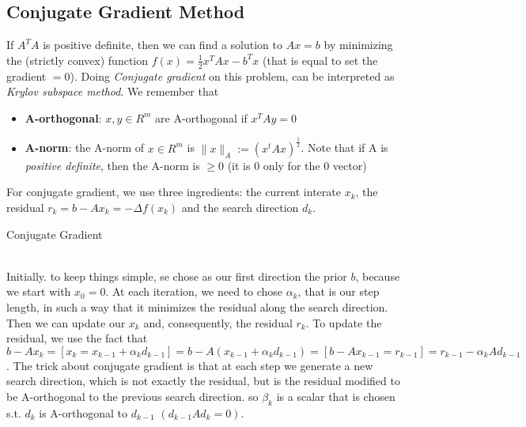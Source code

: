 \documentclass{article}
\begin{document}
\subsection{Conjugate Gradient Method}
If $A^{T}A$ is positive definite, then we can find a solution to $Ax = b$ by minimizing the (strictly convex) function $f(x) = \frac{1}{2}x^{T}Ax - b^{T}x$ (that is equal to set the gradient $= 0$). Doing \textit{Conjugate gradient} on this problem, can be interpreted as \textit{Krylov subspace method}. We remember that \begin{itemize}
\item \textbf{A-orthogonal}: $x, y \in R^{m}$ are A-orthogonal if $x^{T}Ay = 0$
\item \textbf{A-norm}: the A-norm of $x \in R^{m}$ is $\|x\|_{A} := (x^{t}Ax)^{\frac{1}{2}}$. Note that if A is \textit{positive definite}, then the A-norm is $\geq 0$ (it is $0$ only for the $0$ vector)
\end{itemize}
For conjugate gradient, we use three ingredients: the current interate $x_{k}$, the residual $r_{k} = b - Ax_{k} = -\Delta f(x_{k})$ and the search direction $d_{k}$.
\makeatletter
\def\BState{\State\hskip-\ALG@thistlm}
\makeatother
\begin{algorithm}
\caption{Conjugate Gradient}\label{euclid}
\end{algorithm}
\\Initially. to keep things simple, se chose as our first direction the prior $b$, because we start with $x_{0} = 0$. At each iteration, we need to chose $\alpha_{k}$, that is our step length, in such a way that it minimizes the residual along the search direction. Then we can update our $x_{k}$ and, consequently, the residual $r_{k}$. To update the residual, we use the fact that $b - Ax_{k} = [x_{k} = x_{k-1} + \alpha_{k}d_{k-1}] = b - A(x_{k-1} + \alpha_{k}d_{k-1}) = [b-Ax_{k-1} = r_{k-1}] = r_{k-1} - \alpha_{k}Ad_{k-1}$. The trick about conjugate gradient is that at each step we generate a new search direction, which is not exactly the residual, but is the residual modified to be A-orthogonal to the previous search direction. so $\beta_{k}$ is a scalar that is chosen s.t. $d_{k}$ is A-orthogonal to $d_{k-1}$ $(d_{k-1}Ad_{k} = 0)$. 
\end{document}
